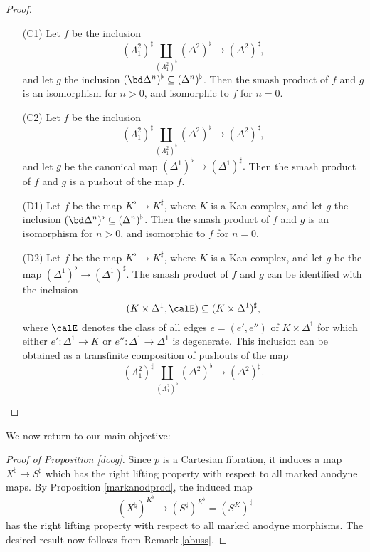 \begin{proof}
\begin{itemize}
\item[(C1)] Let $f$ be the inclusion $$(\Lambda^2_1)^{\sharp} \coprod_{ (\Lambda^2_1)^{\flat} } (\Delta^2)^{\flat} \rightarrow (\Delta^2)^{\sharp},$$ and let $g$ the inclusion
$(\bd \Delta^n)^{\flat} \subseteq (\Delta^n)^{\flat}$. Then the smash product of $f$ and $g$ is an isomorphism for $n > 0$, and isomorphic to $f$ for $n=0$.

\item[(C2)] Let $f$ be the inclusion $$(\Lambda^2_1)^{\sharp} \coprod_{ (\Lambda^2_1)^{\flat} } (\Delta^2)^{\flat} \rightarrow (\Delta^2)^{\sharp},$$ and let $g$ be the canonical map $(\Delta^1)^{\flat} \rightarrow (\Delta^1)^{\sharp}.$ Then the smash product of $f$ and $g$ is a pushout of the map $f$.

\item[(D1)] Let $f$ be the map $K^{\flat} \rightarrow K^{\sharp}$, where $K$ is a Kan complex, and let $g$ the inclusion $(\bd \Delta^n)^{\flat} \subseteq (\Delta^n)^{\flat}$. Then the smash product of $f$ and $g$ is an isomorphism for $n > 0$, and isomorphic to $f$ for $n=0$.

\item[(D2)] Let $f$ be the map $K^{\flat} \rightarrow K^{\sharp}$, where $K$ is a Kan complex, and let $g$ be the map $(\Delta^1)^{\flat} \rightarrow (\Delta^1)^{\sharp}$. The smash product of $f$ and $g$ can be identified with the inclusion
$$(K \times \Delta^1, \calE) \subseteq (K \times \Delta^1)^{\sharp},$$ where $\calE$
denotes the class of all edges $e=(e',e'')$ of $K \times \Delta^1$ for which either $e': \Delta^1 \rightarrow K$ or $e'': \Delta^1 \rightarrow \Delta^1$ is degenerate. This inclusion can be obtained as a transfinite composition of pushouts of the map $$(\Lambda^2_1)^{\sharp} \coprod_{ (\Lambda^2_1)^{\flat} } (\Delta^2)^{\flat} \rightarrow (\Delta^2)^{\sharp}.$$
\end{itemize}
\end{proof}

We now return to our main objective:

\begin{proof}[Proof of Proposition \ref{doog}]
Since $p$ is a Cartesian fibration, it induces a map
$X^{\natural} \rightarrow S^{\sharp}$ which has the right lifting property with respect to all marked anodyne maps. By Proposition \ref{markanodprod}, the induced map
$$ (X^{\natural})^{K^{\flat}} \rightarrow (S^{\sharp})^{K^{\flat}}=(S^K)^{\sharp}$$
has the right lifting property with respect to all marked anodyne morphisms. The desired result now follows from Remark \ref{abuss}.
\end{proof}

